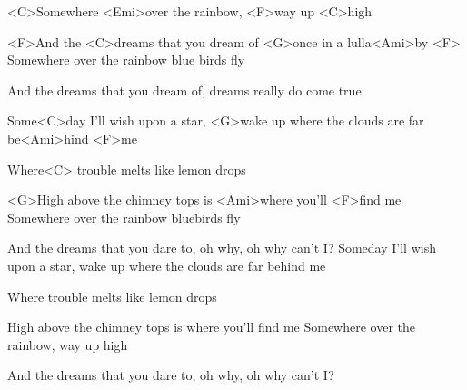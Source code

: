 

\zs

<C>Somewhere <Emi>over the rainbow, <F>way up <C>high

<F>And the <C>dreams that you dream of <G>once in a lulla<Ami>by <F> 
\ks
\zs
Somewhere over the rainbow blue birds fly

And the dreams that you dream of, dreams really do come true
\ks
\zr

Some<C>day I'll wish upon a star,
<G>wake up where the clouds are far be<Ami>hind <F>me

Where<C> trouble melts like lemon drops

<G>High above the chimney tops is <Ami>where you'll <F>find me
\kr
\zs
Somewhere over the rainbow bluebirds fly

And the dreams that you dare to, oh why, oh why can't I?
\ks
\zr
Someday I'll wish upon a star, wake up where the clouds are far behind me

Where trouble melts like lemon drops

High above the chimney tops is where you'll find me
\kr
\zs
Somewhere over the rainbow, way up high

And the dreams that you dare to, oh why, oh why can't I?
\ks

\kp



